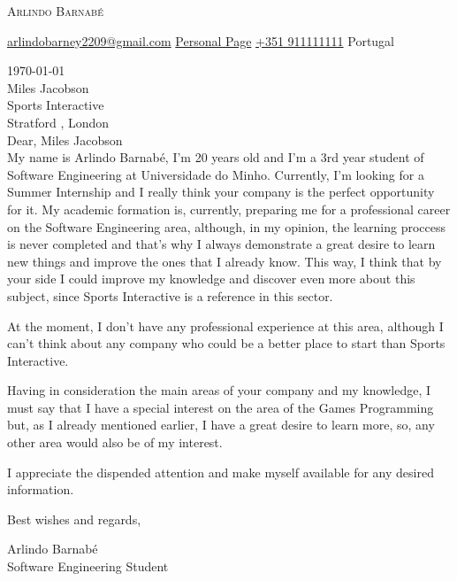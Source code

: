\documentclass[12pt]{letter}
\makeatletter
\newcommand{\myname}{Arlindo Barnabé}
\newcommand{\mytitle}{Software Engineering Student}
\newcommand{\myemail}{arlindobarney2209@gmail.com}
\newcommand{\mypage}{https://beasrodrigues24.github.io/yaPP/}
\newcommand{\myphone}{+351 911111111}
\newcommand{\mylocation}{Portugal}
\newcommand{\recipient}{Miles Jacobson}
\newcommand{\greeting}{Dear, }
\newcommand{\closer}{Best wishes and regards, }
\newcommand{\company}{Sports Interactive}
\newcommand{\city}{Stratford}
\newcommand{\state}{London}
\makeatother
\begin{document}
\AddToShipoutPictureBG{
\color{gr}
\AtPageUpperLeft{\rule[-1.3in]{\paperwidth}{1.3in}}
}

\begin{center}
{\fontsize{28}{0}\selectfont\scshape \myname}

\href{mailto:\myemail}{\faEnvelope\enspace \myemail}\hfill
\href{\mypage}{\faSafari\enspace Personal Page}\hfill
\href{tel:\myphone}{\faPhone\enspace \myphone}\hfill
\faMapMarker\enspace \mylocation
\end{center}

\vspace{0.2in}

\today \\ 

\vspace{-0.1in}\recipient\\

\company\\ 
\city
, \state\\ 

\vspace{-0.1in} \greeting  \recipient\\

\vspace{-0.1in}\setlength\parindent{24pt}
\noident
My name is Arlindo Barnabé, I'm 20 years old and I'm a 3rd year student of Software Engineering at Universidade do Minho. Currently, I'm looking for a Summer Internship and I really think your company is the perfect opportunity for it.
My academic formation is, currently, preparing me for a professional career on the Software Engineering area, although, in my opinion, the learning proccess is never completed and that's why I always demonstrate a great desire to learn new things and improve the ones that I already know.
This way, I think that by your side I could improve my knowledge and discover even more about this subject, since Sports Interactive is a reference in this sector.

At the moment, I don't have any professional experience at this area, although I can't think about any company who could be a better place to start than Sports Interactive.

Having in consideration the main areas of your company and my knowledge, I must say that I have a special interest on the area of the Games Programming but, as I already mentioned earlier, I have a great desire to learn more, so, any other area would also be of my interest.

I appreciate the dispended attention and make myself available for any desired information.

\vspace{0.1in}
\vfill

\begin{flushright}
\closer

\vspace{-0.1in}\myname\\
\mytitle
\end{flushright}
\end{document}
